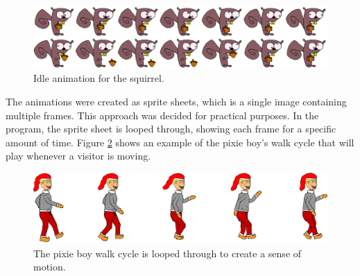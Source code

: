 \begin{figure}[htbp]
\centering
\includegraphics[width=1.00\textwidth]{Pictures/Design/squirrel_animation}
\caption{Idle animation for the squirrel.}
\label{fig:squirrel_animation}
\end{figure}

The animations were created as sprite sheets, which is a single image containing multiple frames. This approach was decided for practical purposes. In the program, the sprite sheet is looped through, showing each frame for a specific amount of time. Figure \ref{fig:Design_PixieBoyWalking} shows an example of the pixie boy's walk cycle that will play whenever a visitor is moving.

\begin{figure}[htbp]
\centering
\includegraphics[width=1.00\textwidth]{Pictures/Design/PixieWalking.png}
\caption{The pixie boy walk cycle is looped through to create a sense of motion.}
\label{fig:Design_PixieBoyWalking}
\end{figure}